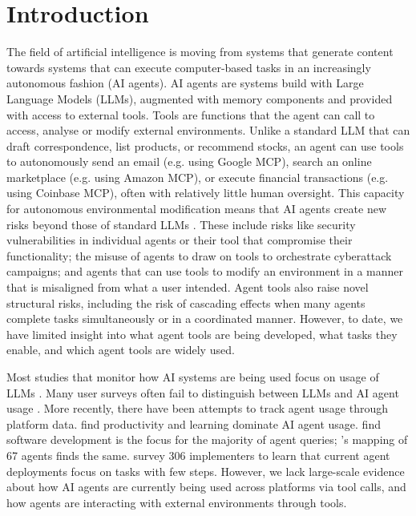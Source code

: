 \documentclass[manuscript,screen,nonacm,oneside]{acmart}
\begin{document}

\maketitle

\section{Introduction}
\label{sec:introduction}

The field of artificial intelligence is moving from systems that generate content towards systems that can execute computer-based tasks in an increasingly autonomous fashion (AI agents). AI agents are systems build with Large Language Models (LLMs), augmented with memory components and provided with access to external tools.
Tools are functions that the agent can call to access, analyse or modify external environments. Unlike a standard LLM that can draft correspondence, list products, or recommend stocks, an agent can use tools to autonomously send an email (e.g. using Google MCP), search an online marketplace (e.g. using Amazon MCP), or execute financial transactions (e.g. using Coinbase MCP), often with relatively little human oversight. This capacity for autonomous environmental modification means that AI agents create new risks beyond those of standard LLMs \citep{cihon2025measuring}. These include risks like security vulnerabilities in individual agents or their tool that compromise their functionality; the misuse of agents to draw on tools to orchestrate cyberattack campaigns; and agents that can use tools to modify an environment in a manner that is misaligned from what a user intended. Agent tools also raise novel structural risks, including the risk of
cascading effects when many agents complete tasks simultaneously or in a coordinated manner. However, to date, we have limited insight into what agent tools are being developed, what tasks they enable, and which agent tools are widely used.

Most studies that monitor how AI systems are being used focus on usage of LLMs \citep{chatterji2025people,handa2025which}. Many user surveys often fail to distinguish between LLMs and AI agent usage \citep{hai2025aiindex,googleRealworldCases,pwc2024agents}. More recently, there have been attempts to track agent usage through platform data. \citep{yang2025adoption} find productivity and learning dominate AI agent usage.  \citep{aubakirova2025state} find software development is the focus for the majority of agent queries;  \citep{casper2025agent}'s mapping of 67 agents    finds the same.  \citep{pan2025measuring} survey 306 implementers to learn that current agent deployments focus on tasks with few steps. However, we lack large-scale evidence about how AI agents are currently being used across platforms via tool calls, and how agents are interacting with external environments through tools. 
\end{document}
